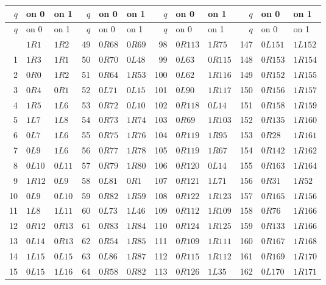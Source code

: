 \begingroup\fontsize{9}{10.5}\selectfont
\setlength{\tabcolsep}{3pt}
\begin{longtable}{@{}rll@{\quad}rll@{\quad}rll@{\quad}rll@{}}
\toprule $q$ & on 0 & on 1 & $q$ & on 0 & on 1 & $q$ & on 0 & on 1 & $q$ & on 0 & on 1 \\
\midrule\endfirsthead
\toprule $q$ & on 0 & on 1 & $q$ & on 0 & on 1 & $q$ & on 0 & on 1 & $q$ & on 0 & on 1 \\
\midrule\endhead
\bottomrule\endfoot
0 & $1R1$ & $1R2$ & 49 & $0R68$ & $0R69$ & 98 & $0R113$ & $1R75$ & 147 & $0L151$ & $1L152$ \\
1 & $1R3$ & $1R1$ & 50 & $0R70$ & $0L48$ & 99 & $0L63$ & $0R115$ & 148 & $0R153$ & $1R154$ \\
2 & $0R0$ & $1R2$ & 51 & $0R64$ & $1R53$ & 100 & $0L62$ & $1R116$ & 149 & $0R152$ & $1R155$ \\
3 & $0R4$ & $0R1$ & 52 & $0L71$ & $0L15$ & 101 & $0L90$ & $1R117$ & 150 & $0R156$ & $1R157$ \\
4 & $1R5$ & $1L6$ & 53 & $0R72$ & $0L10$ & 102 & $0R118$ & $0L14$ & 151 & $0R158$ & $1R159$ \\
5 & $1L7$ & $1L8$ & 54 & $0R73$ & $1R74$ & 103 & $0R69$ & $1R103$ & 152 & $0R135$ & $1R160$ \\
6 & $0L7$ & $1L6$ & 55 & $0R75$ & $1R76$ & 104 & $0R119$ & $1R95$ & 153 & $0R28$ & $1R161$ \\
7 & $0L9$ & $1L6$ & 56 & $0R77$ & $1R78$ & 105 & $0R119$ & $1R67$ & 154 & $0R142$ & $1R162$ \\
8 & $0L10$ & $0L11$ & 57 & $0R79$ & $1R80$ & 106 & $0R120$ & $0L14$ & 155 & $0R163$ & $1R164$ \\
9 & $1R12$ & $0L9$ & 58 & $0L81$ & $0R1$ & 107 & $0R121$ & $1L71$ & 156 & $0R31$ & $1R52$ \\
10 & $0L9$ & $0L10$ & 59 & $0R82$ & $1R59$ & 108 & $0R122$ & $1R123$ & 157 & $0R165$ & $1R156$ \\
11 & $1L8$ & $1L11$ & 60 & $0L73$ & $1L46$ & 109 & $0R112$ & $1R109$ & 158 & $0R76$ & $1R166$ \\
12 & $0R12$ & $0R13$ & 61 & $0R83$ & $1R84$ & 110 & $0R124$ & $1R125$ & 159 & $0R133$ & $1R166$ \\
13 & $0L14$ & $0R13$ & 62 & $0R54$ & $1R85$ & 111 & $0R109$ & $1R111$ & 160 & $0R167$ & $1R168$ \\
14 & $1L15$ & $0L15$ & 63 & $0L86$ & $1R87$ & 112 & $0R115$ & $1R112$ & 161 & $0R169$ & $1R170$ \\
15 & $0L15$ & $1L16$ & 64 & $0R58$ & $0R82$ & 113 & $0R126$ & $1L35$ & 162 & $0L170$ & $1R171$ \\

\end{longtable}
